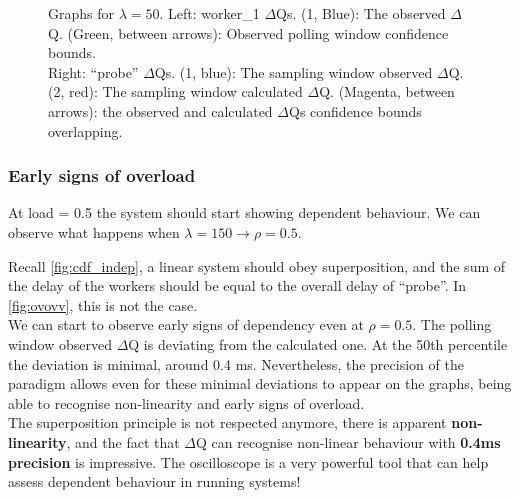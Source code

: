 \begin{figure}[H]
\begin{subfigure}{.5\textwidth}
                \label{fig:norm_ex_2}
            \end{subfigure}
            \caption{Graphs for $\lambda = 50$. Left: worker\_1 $\Delta$Qs. (1, Blue): The observed $\Delta$Q. (Green, between arrows): Observed polling window confidence bounds. \\
            Right: ``probe'' $\Delta$Qs. (1, blue): The sampling window observed $\Delta$Q. (2, red): The sampling window calculated $\Delta$Q. (Magenta, between arrows): the observed and calculated $\Delta$Qs confidence bounds overlapping.}
            \label{fig:norm_ex}
        \end{figure}
    
\subsubsection{Early signs of overload}
    
    At load = 0.5 the system should start showing dependent behaviour. We can observe what happens when $\lambda = 150 \rightarrow \rho = 0.5$.
    
    Recall \ref{fig:cdf_indep}, a linear system should obey superposition, and the sum of the delay of the workers should be equal to the overall delay of ``probe''. In \cref{fig:ovovv}, this is not the case. \\
    We can start to observe early signs of dependency even at $\rho = 0.5$. The polling window observed $\Delta$Q is deviating from the calculated one. At the 50th percentile the deviation is minimal, around 0.4 ms. Nevertheless, the precision of the paradigm allows even for these minimal deviations to appear on the graphs, being able to recognise non-linearity and early signs of overload. \\
    The superposition principle is not respected anymore, there is apparent \textbf{non-linearity}, and the fact that $\Delta$Q can recognise non-linear behaviour with \textbf{0.4ms precision} is impressive. The oscilloscope is a very powerful tool that can help assess dependent behaviour in running systems!
 
